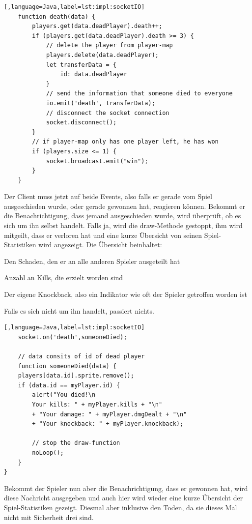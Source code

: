 \begin{lstlisting}[,language=Java,label=lst:impl:socketIO]
    function death(data) {
        players.get(data.deadPlayer).death++;
        if (players.get(data.deadPlayer).death >= 3) {
            // delete the player from player-map
            players.delete(data.deadPlayer);
            let transferData = {
                id: data.deadPlayer
            }
            // send the information that someone died to everyone
            io.emit('death', transferData);
            // disconnect the socket connection
            socket.disconnect();
        }
        // if player-map only has one player left, he has won 
        if (players.size <= 1) {
            socket.broadcast.emit("win");
        }
    }
 \end{lstlisting}

Der Client muss jetzt auf beide Events, also falls er gerade vom Spiel ausgeschieden wurde, oder gerade gewonnen hat, reagieren können.
Bekommt er die Benachrichtigung, dass jemand ausgeschieden wurde, wird überprüft, ob es sich um ihn selbst handelt.
Falls ja, wird die draw-Methode gestoppt, ihm wird mitgeilt, dass er verloren hat und eine kurze Übersicht von seinen Spiel-Statistiken wird angezeigt.
Die Übersicht beinhaltet:
\begin{compactitem}
    \item Den Schaden, den er an alle anderen Spieler ausgeteilt hat
    \item Anzahl an Kills, die erzielt worden sind
    \item Der eigene Knockback, also ein Indikator wie oft der Spieler getroffen worden ist
\end{compactitem}
Falls es sich nicht um ihn handelt, passiert nichts.

\begin{lstlisting}[,language=Java,label=lst:impl:socketIO]
    socket.on('death',someoneDied);

    // data consits of id of dead player
    function someoneDied(data) {
    players[data.id].sprite.remove();
    if (data.id == myPlayer.id) {
        alert("You died!\n
        Your kills: " + myPlayer.kills + "\n" 
        + "Your damage: " + myPlayer.dmgDealt + "\n" 
        + "Your knockback: " + myPlayer.knockback);

        // stop the draw-function
        noLoop();
    }
}
 \end{lstlisting}

Bekommt der Spieler nun aber die Benachrichtigung, dass er gewonnen hat, wird diese Nachricht ausgegeben und auch hier wird wieder eine kurze Übersicht der Spiel-Statistiken gezeigt.
Diesmal aber inklusive den Toden, da sie dieses Mal nicht mit Sicherheit drei sind.


